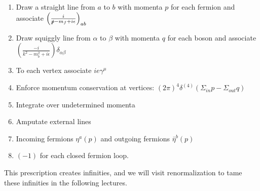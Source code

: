 \begin{enumerate}
\item Draw a straight line from $a$ to $b$ with momenta $p$ for each fermion and associate $\left( \frac{i}{\slashed{p} - m_f + i \epsilon} \right)_{ab}$
\item Draw squiggly line from $\alpha$ to $\beta$ with momenta $q$ for each boson and associate $\left( \frac{-i}{k^2 - m_b^2 + i \epsilon} \right) \delta_{\alpha \beta}$
\item To each vertex associate $i e \gamma^\mu$
\item Enforce momentum conservation at vertices: $(2\pi)^4 \delta^{(4)} (\Sigma_{in} p - \Sigma_{out} q)$
\item Integrate over undetermined momenta
\item Amputate external lines
\item Incoming fermions  $\eta^a (p)$ and outgoing fermions $\bar{\eta}^b (p)$
\item $(-1)$ for each closed fermion loop.
\end{enumerate}

\noindent This prescription creates infinities, and we will visit renormalization to tame these infinities in the following lectures.